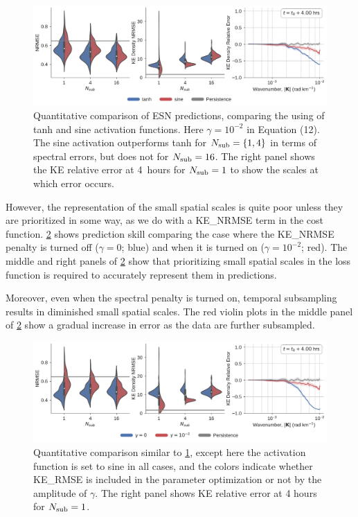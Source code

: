 \documentclass[draft,ms]{agutexSI2019}
\begin{document}
\begin{figure}
    \centering
    \includegraphics[width=\textwidth]{figures/rc_tanh_vs_sine_quantitative.pdf}
    \caption{
        Quantitative comparison of ESN predictions, comparing the using of
        tanh and sine activation functions. Here
        $\gamma = 10^{-2}$ in Equation (12).
        The sine activation outperforms tanh for $N_\text{sub}=\{1,4\}$ in terms of
        spectral errors, but does not for $N_\text{sub}=16$. The right panel shows the KE
        relative error at 4~hours for $N_\text{sub} = 1$ to show the scales at which error
        occurs.
    }
    \label{fig:tanh-vs-sine-quant}
\end{figure}

However, the representation of the small spatial scales is quite poor unless
they are prioritized in some way, as we do with a KE\_NRMSE term in the cost
function.
\cref{fig:sine-gamma} shows prediction skill comparing the case where the
KE\_NRMSE penalty is turned off ($\gamma=0$; blue) and when it is turned on
($\gamma=10^{-2}$; red).
The middle and right panels of \cref{fig:sine-gamma} show that prioritizing
small spatial scales in the loss function is required to accurately represent
them in predictions.

Moreover, even when the spectral penalty is turned on, temporal subsampling
results in diminished small spatial scales.
The red violin plots in the middle panel of \cref{fig:sine-gamma} show a gradual
increase in error as the data are further subsampled.

\begin{figure}
    \centering
    \includegraphics[width=\textwidth]{figures/rc_sine_gamma_quantitative.pdf}
    \caption{
        Quantitative comparison similar to \cref{fig:tanh-vs-sine-quant}, except here the activation
        function is set to sine in all cases, and the colors indicate whether KE\_RMSE is
        included in the parameter optimization or not by the amplitude of
        $\gamma$. The
        right panel shows KE relative error at 4 hours for $N_\text{sub} = 1$.
    }
    \label{fig:sine-gamma}
\end{figure}


\end{document}
